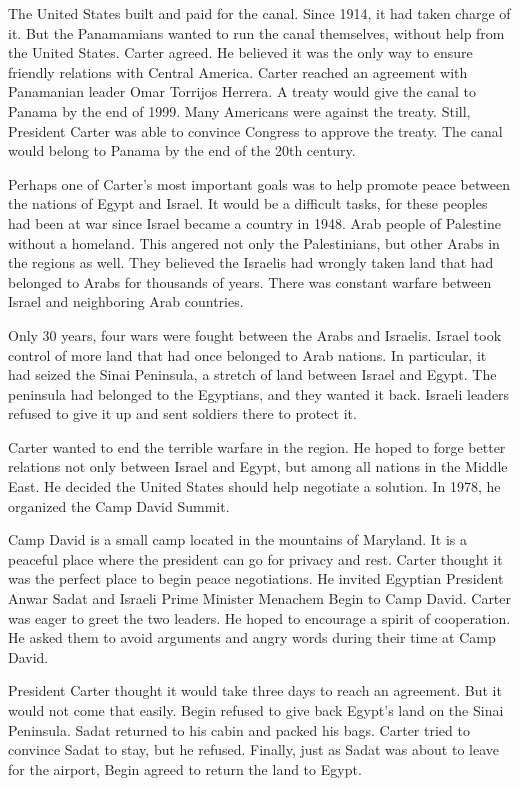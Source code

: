 \documentclass{article}
\begin{document}
The United States built and paid for the canal. Since 1914, it had taken charge of it. But the Panamamians wanted to run the canal themselves, without help from the United States. Carter agreed. He believed it was the only way to ensure friendly relations with Central America. Carter reached an agreement with Panamanian leader Omar Torrijos Herrera. A treaty would give the canal to Panama by the end of 1999. Many Americans were against the treaty. Still, President Carter was able to convince Congress to approve the treaty. The canal would belong to Panama by the end of the 20th century.

Perhaps one of Carter's most important goals was to help promote peace between the nations of Egypt and Israel. It would be a difficult tasks, for these peoples had been at war since Israel became a country in 1948. Arab people of Palestine without a homeland. This angered not only the Palestinians, but other Arabs in the regions as well. They believed the Israelis had wrongly taken land that had belonged to Arabs for thousands of years. There was constant warfare between Israel and neighboring Arab countries.

Only 30 years, four wars were fought between the Arabs and Israelis. Israel took control of more land that had once belonged to Arab nations. In particular, it had seized the Sinai Peninsula, a stretch of land between Israel and Egypt. The peninsula had belonged to the Egyptians, and they wanted it back. Israeli leaders refused to give it up and sent soldiers there to protect it.

Carter wanted to end the terrible warfare in the region. He hoped to forge better relations not only between Israel and Egypt, but among all nations in the Middle East. He decided the United States should help negotiate a solution. In 1978, he organized the Camp David Summit.

Camp David is a small camp located in the mountains of Maryland. It is a peaceful place where the president can go for privacy and rest. Carter thought it was the perfect place to begin peace negotiations. He invited Egyptian President Anwar Sadat and Israeli Prime Minister Menachem Begin to Camp David. Carter was eager to greet the two leaders. He hoped to encourage a spirit of cooperation. He asked them to avoid arguments and angry words during their time at Camp David.

President Carter thought it would take three days to reach an agreement. But it would not come that easily. Begin refused to give back Egypt's land on the Sinai Peninsula. Sadat returned to his cabin and packed his bags. Carter tried to convince Sadat to stay, but he refused. Finally, just as Sadat was about to leave for the airport, Begin agreed to return the land to Egypt.
\end{document}
